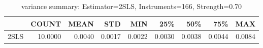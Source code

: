 \begin{table}[ht]
\centering
\caption{variance summary: Estimator=2SLS, Instruments=166, Strength=0.70}
\begin{tabular}{lrrrrrrrr}
\toprule
 & COUNT & MEAN & STD & MIN & 25\% & 50\% & 75\% & MAX \\
\midrule
2SLS & 10.0000 & 0.0040 & 0.0017 & 0.0022 & 0.0030 & 0.0038 & 0.0044 & 0.0084 \\
\bottomrule
\end{tabular}
\end{table}
